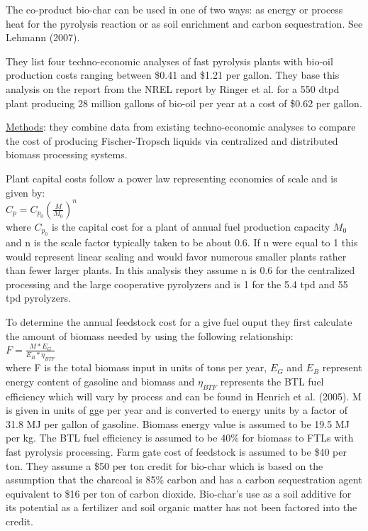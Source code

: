 \documentclass{article}\usepackage[]{graphicx}\usepackage[]{color}
\begin{document}
The co-product bio-char can be used in one of two ways: as energy or process heat for the pyrolysis reaction or as soil enrichment and carbon sequestration.  See Lehmann (2007).

They list four techno-economic analyses of fast pyrolysis plants with bio-oil production costs ranging between \$0.41 and \$1.21 per gallon.  They base this analysis on the report from the NREL report by Ringer et al. for a 550 dtpd plant producing 28 million gallons of bio-oil per year at a cost of \$0.62 per gallon.

\underline{Methods}: they combine data from existing techno-economic analyses to compare the cost of producing Fischer-Tropsch liquids via centralized and distributed biomass processing systems.

Plant capital costs follow a power law representing economies of scale and is given by: \\

$C_p = C_{p_0}(\frac{M}{M_0})^n$ \\

where $C_{p_0}$ is the capital cost for a plant of annual fuel production capacity $M_0$ and n is the scale factor typically taken to be about 0.6.  If n were equal to 1 this would represent linear scaling and would favor numerous smaller plants rather than fewer larger plants.  In this analysis they assume n is 0.6 for the centralized processing and the large cooperative pyrolyzers and is 1 for the 5.4 tpd and 55 tpd pyrolyzers.

To determine the annual feedstock cost for a give fuel ouput they first calculate the amount of biomass needed by using the following relationship: \\

$F = \frac{M*E_G}{E_B*\eta_{BTF}}$ \\

where F is the total biomass input in units of tons per year, $E_G$ and $E_B$ represent energy content of gasoline and biomass and $\eta_{BTF}$ represents the BTL fuel efficiency which will vary by process and can be found in Henrich et al. (2005).  M is given in units of gge per year and is converted to energy units by a factor of 31.8 MJ per gallon of gasoline.  Biomass energy value is assumed to be 19.5 MJ per kg.  The BTL fuel efficiency is assumed to be 40\% for biomass to FTLs with fast pyrolysis processing.  Farm gate cost of feedstock is assumed to be \$40 per ton.  They assume a \$50 per ton credit for bio-char which is based on the assumption that the charcoal is 85\% carbon and has a carbon sequestration agent equivalent to \$16 per ton of carbon dioxide.  Bio-char's use as a soil additive for its potential as a fertilizer and soil organic matter has not been factored into the credit.
\end{document}
